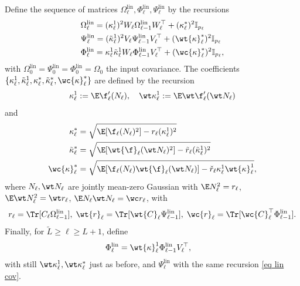 \begin{definition}
    \label{def: linearized_covs}
    Define the sequence of matrices $\Omega_\ell^\mathrm{lin},\Phi_\ell^\mathrm{lin}, \Psi_\ell^\mathrm{lin}$ by the recursions
    \begin{equation}\label{eq lin cov}
    \begin{split}
         & \Omega_{\ell}^{\mathrm{lin}}=(\kappa^1_\ell)^2 W_\ell\Omega_{\ell-1}^{\mathrm{lin}}W_\ell^\top+(\kappa^{*}_\ell)^2\mathbb{I}_{p_\ell}                             \\
         & \Psi_{\ell}^{\mathrm{lin}}=(\tilde{\kappa}^1_\ell )^2V_\ell\Psi_{\ell-1}^{\mathrm{lin}}V_\ell^\top+(\wt{\kappa}^{*}_\ell)^2\mathbb{I}_{p_\ell} \\
         & \Phi_{\ell}^{\mathrm{lin}}=\kappa^1_\ell\tilde{\kappa}^1_\ell W_\ell\Phi_{\ell-1}^{\mathrm{lin}} V_\ell^\top +(\wc{\kappa}^*_\ell)^2\mathbb{I}_{p_\ell},
         \end{split}
    \end{equation}
    with $\Omega_0^{\mathrm{lin}}=\Psi_0^{\mathrm{lin}}=\Phi_0^{\mathrm{lin}}=\Omega_0$ the input covariance.
    The coefficients $\{\kappa_\ell^1,\tilde{\kappa}_\ell^1,\kappa_\ell^*,\tilde{\kappa}_\ell^*, \wc{\kappa}^*_\ell\}$ are defined by the recursion
    \begin{equation}
        \kappa_\ell^1 := \E \f_\ell'(N_\ell), \quad \wt \kappa_\ell^1:=\E \wt\f_\ell'(\wt N_\ell)
    \end{equation}
    and 
    \begin{equation}
        \begin{split}
            \kappa^\ast_\ell &= \sqrt{\E[\f_\ell(N_\ell)^2]-r_\ell(\kappa^1_\ell)^2}                                         \\
            \tilde{\kappa}^*_\ell&= \sqrt{\E [\wt{\f}_\ell(\wt N_\ell)^2]-\tilde{r}_\ell(\tilde{\kappa}^1_\ell)^2} \\
            \wc{\kappa}^*_\ell&=\sqrt{\E [\f_\ell(N_\ell )\wt{\f}_\ell(\wt N_\ell)]-\check{r}_\ell \kappa^1_\ell\wt{\kappa}^1_\ell},
        \end{split}
    \end{equation}
    where $N_\ell,\wt N_\ell$ are jointly mean-zero Gaussian with $\E N_\ell^2=r_\ell$, $\E \wt N_\ell^2=\wt r_\ell$, $\E N_\ell\wt N_\ell=\wc r_\ell$, with 
    \begin{equation*}
        r_{\ell}=\Tr[C_\ell \Omega_{\ell-1}^{\mathrm{lin}}], \; \wt{r}_{\ell}=\Tr[\wt{C}_\ell \Psi_{\ell-1}^{\mathrm{lin}}],\; \wc{r}_{\ell}=\Tr[\wc{C}_\ell^\top \Phi_{\ell-1}^{\mathrm{lin}}].
    \end{equation*}
    Finally, for $\tilde{L}\ge \ell\ge L+1$, define
    \begin{equation}
    \begin{split}
         \Phi_{\ell}^{\mathrm{lin}}&=\wt{\kappa}^1_\ell \Phi_{\ell-1}^{\mathrm{lin}}V_\ell^\top,
         \end{split}
    \end{equation}
    with still $\wt\kappa_\ell^1,\wt\kappa_\ell^\ast$ just as before, and $ \Psi_{\ell}^{\mathrm{lin}}$ with the same recursion \eqref{eq lin cov}.
\end{definition}

